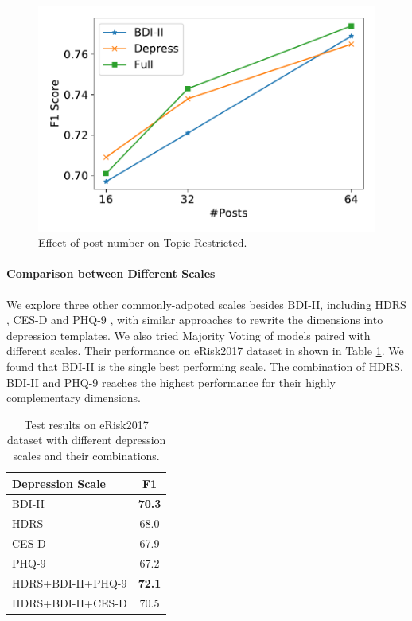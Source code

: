 \begin{figure}[hb]
    \centering
    \includegraphics[width=0.88\columnwidth]{figures/post_numbers.pdf}
    \caption{Effect of post number on Topic-Restricted.}
    \label{fig:post_numbers}
\end{figure}

\paragraph{Comparison between Different Scales}
We explore three other commonly-adpoted scales besides BDI-II, including HDRS \citep{hamilton1986hamilton}, CES-D \citep{Lenore1977CES-D} and PHQ-9 \citep{kroenke2001phq}, with similar approaches to rewrite the dimensions into depression templates. We also tried Majority Voting of models paired with different scales. Their performance on eRisk2017 dataset in shown in Table \ref{table:different scales}. We found that BDI-II is the single best performing scale. The combination of HDRS, BDI-II and PHQ-9 reaches the highest performance for their highly complementary dimensions. 
\begin{table}[th]
    \centering
	\small
    \begin{tabular}{l|c}
        \hline
        Depression Scale & F1 \\
        \hline
        BDI-II & \textbf{70.3} \\
        HDRS & 68.0 \\
        CES-D & 67.9 \\
        PHQ-9 & 67.2\\
        \hline
        HDRS+BDI-II+PHQ-9 & \textbf{72.1} \\
        HDRS+BDI-II+CES-D & 70.5 \\
        \hline
    \end{tabular}
    \caption{\label{table:different scales} Test results on eRisk2017 dataset with different depression scales and their combinations.}
\end{table}
